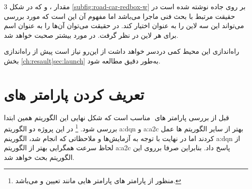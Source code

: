 \begin{figure}[b!]
	\centering
	\caption[]{%
	}
	\label{fig:road-car-total}
\end{figure}

3 مقدار  ،  و  که در شکل \ref{subfig:road-car-redbox-w} بر روی جاده نوشته شده است در حقیقت مرتبط با بحث فنی ماجرا می‌باشد اما مفهوم آن این است که  مورد بررسی می‌تواند این سه لاین را به عنوان  اختیار کند. در حقیقت می‌توان آن‌ها را به عنوان اسم برای هر لاین در نظر گرفت. در مورد  بیشتر صحبت خواهد شد.

\begin{note}
	راه‌اندازی این محیط کمی دردسر خواهد داشت از این‌رو نیاز است پیش از راه‌اندازی بخش \ref{ch:resault|sec:launch} به‌طور دقیق مطالعه شود.
\end{note}






\section{تعریف کردن پارامتر های }
قبل از بررسی پارامتر های ‌ مناسب است که شکل نهایی این الگوریتم همین ابتدا بررسی شود.
\footnote{منظور از پارامتر های  پارامتر هایی مانند تعیین  و  می‌باشد.
}
در این پروژه دو الگوریتم \gls{a:dqn} و \gls{a:a2c} بهتر از سایر الگوریتم ها عمل کردند اما در نهایت با توجه به آزمایش‌ها و ملاحظاتی که انجام شد، الگورینم \gls{a:dqn} از لحاظ سرعت همگرایی بهتر از الگوریتم \gls{a:a2c} پاسخ داد. بنابراین صرفا برروی این الگوریتم بحث خواهد شد.




